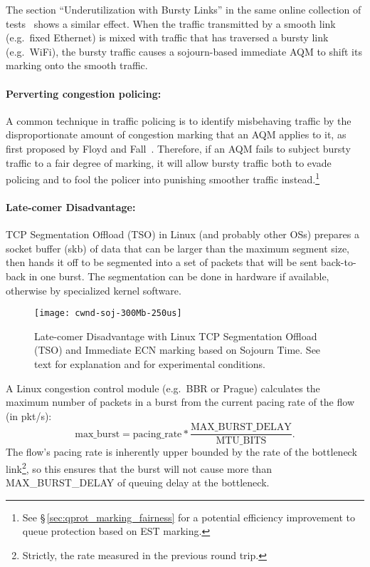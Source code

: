 The section ``Underutilization with Bursty Links'' in the same online collection of tests~\cite{Heist20:L4S_tests} shows a similar effect. When the traffic transmitted by a smooth link (e.g.\ fixed Ethernet) is mixed with traffic that has traversed a bursty link (e.g.\ WiFi), the bursty traffic causes a sojourn-based immediate AQM to shift its marking onto the smooth traffic.

\paragraph{Perverting congestion policing:} A common technique in traffic policing is to identify misbehaving traffic by the disproportionate amount of congestion marking that an AQM applies to it, as first proposed by Floyd and Fall~\cite{Floyd99:Penalty_box}. Therefore, if an AQM fails to subject bursty traffic to a fair degree of marking, it will allow bursty traffic both to evade policing and to fool the policer into punishing smoother traffic instead.\footnote{See \S\,\ref{sec:qprot_marking_fairness} for a potential efficiency improvement to queue protection based on EST marking.}

\paragraph{Late-comer Disadvantage:} TCP Segmentation Offload (TSO) in Linux (and probably other OSs) prepares a socket buffer (skb) of data that can be larger than the maximum segment size, then hands it off to be segmented into a set of packets that will be sent back-to-back in one burst. The segmentation can be done in hardware if available, otherwise by specialized kernel software.
\begin{figure}
	\centering
	\texttt{[image: cwnd-soj-300Mb-250us]}
	\caption{Late-comer Disadvantage with Linux TCP Segmentation Offload (TSO) and Immediate ECN marking based on Sojourn Time. See text for explanation and for experimental conditions.}\label{fig:cwnd-soj-300Mb-250us}
\end{figure}

A Linux congestion control module (e.g.\ BBR or Prague) calculates the maximum number of packets in a burst from the current pacing rate of the flow (in pkt/s):
\[\mathrm{max\_burst} = \mathrm{pacing\_rate} * \frac{\mathrm{MAX\_BURST\_DELAY}}{\mathrm{MTU\_BITS}}.\]
The flow's pacing rate is inherently upper bounded by the rate of the bottleneck link\footnote{Strictly, the rate measured in the previous round trip.}, so this ensures that the burst will not cause more than MAX\_BURST\_DELAY of queuing delay at the bottleneck.

